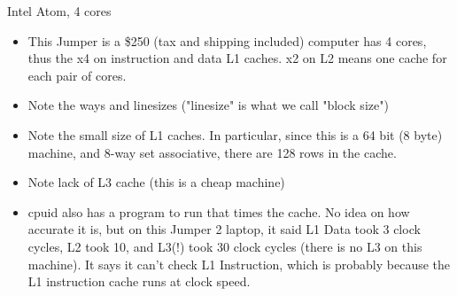 \begin{frame}[fragile]
Intel Atom, 4 cores


\BNotes\ifnum{}
\begin{itemize}
\item This Jumper is a \$250 (tax and shipping included) computer has 4 cores, thus the x4 on instruction and data L1 caches.  x2 on L2 means one cache for each pair of cores.

\item Note the ways and linesizes ("linesize" is what we call "block size")
\item Note the small size of L1 caches.  In particular, since this is a 64 bit (8 byte) machine, and 8-way set associative, there are 128 rows in the cache.  
\item Note lack of L3 cache (this is a cheap machine)
		\bigskip
\item cpuid also has a program to run that times the cache.  No idea on how
	accurate it is, but on this Jumper 2 laptop, it said L1 Data took 3
	clock cycles, L2 took 10, and L3(!) took 30 clock cycles (there is no
	L3 on this machine).  It says it can't check L1 Instruction, which is
	probably because the L1 instruction cache runs at clock speed.
\iffalse
\item 
There are variations on i5, i7, so numbers may vary.  i5 and i7 appears to have
the same size L1,L2 caches.  At least one i5 has 4MB L3 cache.  Anyway, i7 sizes appear to be
\begin{verbatim}
	32kB L1 instruction cache (8-way set associative)  64-byte linesize
	32kB L1 data cache (8-way set associative), 64-byte linesize
	256kB L2 cache (8-way set associative), 64-byte linesize
	8MB+ L3 cache (16-way set associative), 64-byte linesize
\end{verbatim}
with multiple L1 caches matching the number of cores.
\fi
\end{itemize}
\fi\ENotes
\end{frame}

